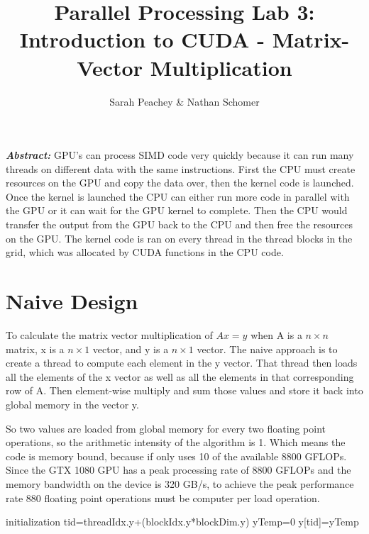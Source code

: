\documentclass[12pt]{article}
\begin{document}
\title{Parallel Processing Lab 3: \\ Introduction to CUDA - Matrix-Vector
Multiplication}
\author{Sarah Peachey \& Nathan Schomer}
\maketitle

\textbf{\textit{Abstract:}} GPU's can process SIMD code very quickly because
it can run many threads on different data with the same instructions. First
the CPU must create resources on the GPU and copy the data over, then the
kernel code is launched. Once the kernel is launched the CPU can either run
more code in parallel with the GPU or it can wait for the GPU kernel to
complete. Then the CPU would transfer the output from the GPU back to the CPU 
and then free the resources on the GPU. The kernel code is ran on every
thread in the thread blocks in the grid, which was allocated by CUDA
functions in the CPU code.   
\newpage

\vspace{-1.5cm}
\section{Naive Design}
\vspace{-0.25cm}

\qquad To calculate the matrix vector multiplication of $Ax=y$ when A is a
$n \times n$ matrix, x is a $n \times 1$ vector, and y is a $n \times 1$
vector. The naive approach is to create a thread to compute each element in
the y vector. That thread then loads all the elements of the x vector as
well as all the elements in that corresponding row of A. Then element-wise
multiply and sum those values and store it back into global memory in the
vector y. 

So two values are loaded from global memory for every two floating
point operations, so the arithmetic intensity of the algorithm is 1. Which
means the code is memory bound, because if only uses 10 of the available 8800
GFLOPs. Since the GTX 1080 GPU has a peak processing rate of 8800 GFLOPs and
the memory bandwidth on the device is 320 GB/s, to achieve the peak
performance rate 880 floating point operations must be computer per load
operation. 

\vspace{1cm}
\begin{algorithm}[H]
 	initialization\;
	tid=threadIdx.y+(blockIdx.y*blockDim.y)\;
	yTemp=0\;
	y[tid]=yTemp\; 
   	
\end{algorithm}
\end{document}
